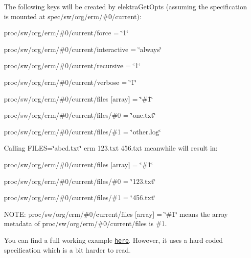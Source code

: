 The following keys will be created by {\ttfamily elektra\+Get\+Opts} (assuming the specification is mounted at {\ttfamily spec/sw/org/erm/\#0/current})\+:


\begin{DoxyItemize}
\item {\ttfamily proc/sw/org/erm/\#0/current/force = \char`\"{}1\char`\"{}}
\item {\ttfamily proc/sw/org/erm/\#0/current/interactive = \char`\"{}always\char`\"{}}
\item {\ttfamily proc/sw/org/erm/\#0/current/recursive = \char`\"{}1\char`\"{}}
\item {\ttfamily proc/sw/org/erm/\#0/current/verbose = \char`\"{}1\char`\"{}}
\item {\ttfamily proc/sw/org/erm/\#0/current/files \mbox{[}array\mbox{]} = \char`\"{}\#1\char`\"{}}
\item {\ttfamily proc/sw/org/erm/\#0/current/files/\#0 = \char`\"{}one.\+txt\char`\"{}}
\item {\ttfamily proc/sw/org/erm/\#0/current/files/\#1 = \char`\"{}other.\+log\char`\"{}}
\end{DoxyItemize}

Calling {\ttfamily F\+I\+L\+ES=\char`\"{}abcd.\+txt\char`\"{} erm 123.\+txt 456.\+txt} meanwhile will result in\+:


\begin{DoxyItemize}
\item {\ttfamily proc/sw/org/erm/\#0/current/files \mbox{[}array\mbox{]} = \char`\"{}\#1\char`\"{}}
\item {\ttfamily proc/sw/org/erm/\#0/current/files/\#0 = \char`\"{}123.\+txt\char`\"{}}
\item {\ttfamily proc/sw/org/erm/\#0/current/files/\#1 = \char`\"{}456.\+txt\char`\"{}}
\end{DoxyItemize}

N\+O\+TE\+: {\ttfamily proc/sw/org/erm/\#0/current/files \mbox{[}array\mbox{]} = \char`\"{}\#1\char`\"{}} means the {\ttfamily array} metadata of {\ttfamily proc/sw/org/erm/\#0/current/files} is {\ttfamily \#1}.

You can find a full working example \href{/home/markus/Projekte/Elektra/current/examples/opts.c}{\tt here}. However, it uses a hard coded specification which is a bit harder to read. 